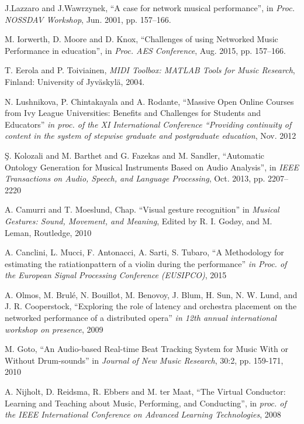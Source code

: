 \documentclass[conference]{IEEEtran}
\begin{document}
\begin{thebibliography}{6}


J.Lazzaro and J.Wawrzynek, ``A case for network musical performance'', in \emph{Proc. NOSSDAV Workshop}, Jun. 2001, pp. 157--166. 


M. Iorwerth, D. Moore and D. Knox, ``Challenges of using Networked Music Performance in education'', in  \emph{Proc. AES Conference}, Aug. 2015, pp. 157--166. 


T. Eerola and P. Toiviainen, \emph{MIDI Toolbox: MATLAB Tools for Music Research}, Finland: University of Jyv{\"a}skyl{\"a},  2004.

N. Lushnikova, P. Chintakayala and A. Rodante, ``Massive Open Online Courses from Ivy League Universities: Benefits and Challenges for Students and Educators'' \emph{in proc. of the XI International Conference “Providing continuity of content in the system of stepwise graduate and postgraduate education}, Nov. 2012

\c{S}. Kolozali and M. Barthet and G. Fazekas and M. Sandler, ``Automatic Ontology Generation for Musical Instruments Based on Audio Analysis'', in \emph{IEEE Transactions on Audio, Speech, and Language Processing}, Oct. 2013, pp. {2207--2220}

A. Camurri and T. Moeslund, Chap. ``Visual gesture recognition'' in \emph{Musical Gestures: Sound, Movement, and Meaning}, Edited by R. I. God{\o}y, and M. Leman, Routledge, 2010

A. Canclini, L. Mucci, F. Antonacci, A. Sarti, S. Tubaro, ``A Methodology for estimating the ratiationpattern of a violin during the performance'' \emph{in Proc. of the European Signal Processing Conference (EUSIPCO)}, 2015

A. Olmos, M. Brul\'{e}, N. Bouillot, M. Benovoy, J. Blum, H. Sun, N. W. Lund, and J. R. Cooperstock, ``Exploring the role of latency and orchestra placement on the networked performance of a distributed opera'' \emph{in 12th annual international workshop on presence}, 2009

M. Goto, ``An Audio-based Real-time Beat Tracking System for Music With or Without Drum-sounds'' in \emph{Journal of New Music Research}, 30:2, pp. 159-171, 2010 

A. Nijholt, D. Reidsma, R. Ebbers and M. ter Maat, ``The Virtual Conductor: Learning and Teaching about Music, Performing, and Conducting'', in \emph{proc. of the IEEE International Conference on Advanced Learning Technologies}, 2008


\end{thebibliography}
\end{document}
